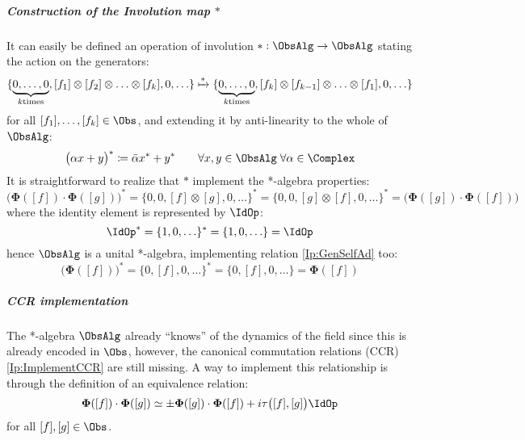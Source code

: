 \documentclass[Main]{subfiles}
\begin{document}
   			\subparagraph{Construction of the Involution map $*$}
	   			It can easily be defined an operation of involution $*:\ObsAlg \rightarrow \ObsAlg$ stating the action on the generators:
				\begin{displaymath}
					\{ \underbrace{0,\ldots, 0}_{k \textrm{times}}, [f_1]\otimes [f_2] \otimes \ldots \otimes [f_k],0,\ldots \}
					\xmapsto{*}
					\{ \underbrace{0,\ldots, 0}_{k \textrm{times}}, [f_k]\otimes [f_{k-1}] \otimes \ldots \otimes [f_1],0,\ldots \}
				\end{displaymath}
				for all $[f_1],\ldots,[f_k] \in \Obs$, and extending it by anti-linearity to the whole of $\ObsAlg$:
				\begin{displaymath}
					\big( \alpha x + y \big)^* \coloneqq \bar{\alpha} x^* + y^* \qquad \forall x,y\in \ObsAlg \; \forall \alpha \in \Complex
				\end{displaymath}
				It is straightforward to realize that $*$ implement the *-algebra properties:
				\begin{equation}
					\big( \mathbf{\Phi}([f]) \cdot \mathbf{\Phi}([g]) \big)^* = \big\{0,0,[f]\otimes [g],0,\ldots \big\}^* =
					\big\{0,0,[g]\otimes [f],0,\ldots \big\}^* = \big( \mathbf{\Phi}([g]) \cdot \mathbf{\Phi}([f]) \big)	
				\end{equation}
				where the identity element is represented by $\IdOp$:
				\begin{equation}
				\IdOp^* = \{1,0,\ldots\}^* =\{1,0,\ldots\}= \IdOp
				\end{equation}
				hence $\ObsAlg$ is a unital *-algebra, implementing relation \ref{Ip:GenSelfAd} too:
				\begin{displaymath}
					\big(\mathbf{\Phi}([f])\big)^* = \big\{ 0, [f],0,\ldots\big\}^* = \big\{ 0, [f],0,\ldots\big\} = \mathbf{\Phi}([f])
				\end{displaymath}			
   			\subparagraph{CCR implementation}
				The *-algebra $\ObsAlg$ already “knows” of the dynamics of the field since this is already encoded in $\Obs$, however, the canonical commutation relations (CCR) \ref{Ip:ImplementCCR} are still missing. 
   		 		A way to implement this relationship is through the definition of an equivalence relation:
   		 			\begin{displaymath}
   		 				\mathbf{\Phi}([f]) \cdot \mathbf{\Phi}([g]) \simeq \pm \mathbf{\Phi}([g]) \cdot \mathbf{\Phi}([f]) + 
   		 				i \tau\big( [f], [g] \big) \IdOp
   		 			\end{displaymath}
   		 		for all $[f],[g] \in \Obs$.\\
\end{document}
